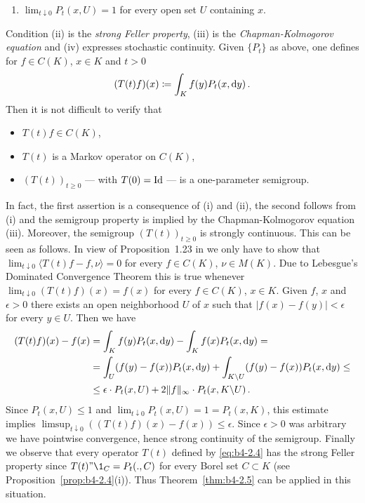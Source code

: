 \begin{example}
\begin{enumerate}[\upshape (i)]
    \item 
    $\lim_{t\downarrow0} P_t(x,U) = 1$ for every open set $U$ containing $x$.
\end{enumerate}
Condition (ii) is the \emph{strong Feller property}, (iii) is the \emph{Chapman-Kolmogorov equation} and (iv) expresses stochastic continuity.
Given $\{P_t\}$ as above, one defines for $f \in C(K)$, $x \in K$ and $t > 0$
\begin{equation}\label{eq:b4-2.4}
    (T(t)f)(x)  \coloneq  \int_K f(y)P_t(x,\mathop{}\!\mathrm{d}{y})\,.
\end{equation}
Then it is not difficult to verify that 
\begin{itemize}[-] 
    \item 
    $T(t)f \in C(K)$, 
    \item 
    $T(t)$ is a Markov operator on $C(K)$, 
    \item 
    $(T(t))_{t \geq 0}$ --- with $T(0) = \operatorname{Id} $ --- is a one-parameter semigroup.
\end{itemize}
In fact, the first assertion is a consequence of (i) and (ii), the second follows from (i) and the semigroup property is implied by the Chapman-Kolmogorov equation (iii).
Moreover, the semigroup $(T(t))_{t \geq 0}$ is strongly continuous.
This can be seen as follows. 
In view of Proposition~1.23 in \citet{davies:1980} we only have
to show that $\lim_{t\downarrow 0}\langle T(t)f-f,\nu\rangle = 0$ for every $f \in C(K)$, $\nu \in M(K)$.
Due to Lebesgue's Dominated Convergence Theorem this is true whenever
$\lim_{t\downarrow0}(T(t)f)(x) = f(x)$ for every $f \in C(K)$, $x \in K$.
Given $f$, $x$
and $\epsilon > 0$ there exists an open neighborhood $U$ of $x$ such that
$|f(x) - f(y)| < \epsilon$ for every $y \in U$.
Then we have
\begin{align*} 
    (T(t)f)(x) - f(x) &= \int_K f(y)P_t(x,\mathop{}\!\mathrm{d}{y}) - \int_K f(x)P_t(x,\mathop{}\!\mathrm{d}{y}) = \\
    &= \int_U (f(y)-f(x))P_t(x,\mathop{}\!\mathrm{d}{y}) + \int_{K\backslash U} (f(y)-f(x))P_t(x,\mathop{}\!\mathrm{d}{y}) \leq \\
    &\leq \epsilon\cdot P_t(x,U) + 2\|f\|_{\infty}\cdot P_t(x,K\backslash U)\,.
\end{align*}
Since $P_t(x,U) \leq 1$ and $\lim_{t\downarrow0} P_t(x,U) = 1 = P_t(x,K)$, this estimate
implies $\limsup_{t\downarrow 0}((T(t)f)(x) - f(x)) \leq \epsilon$.
Since $\epsilon > 0$ was arbitrary we have pointwise convergence, hence strong continuity of the semigroup.
Finally we observe that every operator $T(t)$ defined by \eqref{eq:b4-2.4} has the
strong Feller property since $T(t)"\1_C = P_t(.,C)$ for every Borel set
$C \subset K$ (see Proposition~\ref{prop:b4-2.4}(i)).
Thus Theorem~\ref{thm:b4-2.5} can be applied in this situation.
\end{example}

